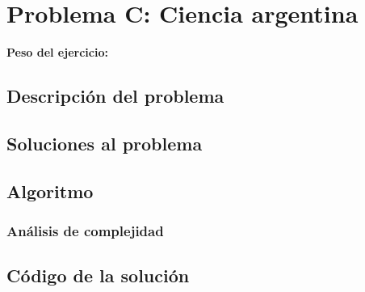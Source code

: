 \newpage{}
\section{Problema C: Ciencia argentina}
\textbf{Peso del ejercicio:}
\subsection{Descripción del problema}

\subsection{Soluciones al problema}

\subsection{Algoritmo}

\subsubsection*{Análisis de complejidad}

\newpage
\subsection{Código de la solución}

